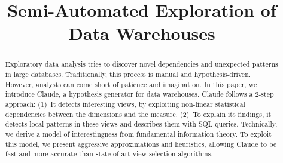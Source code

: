 \documentclass{sig-alternate}
\begin{document}
\title{Semi-Automated Exploration of Data Warehouses}



\maketitle

\begin{abstract}
Exploratory data analysis tries to discover novel dependencies and unexpected
patterns in large databases. Traditional\-ly, this process is manual and
hypothesis-driven. However, analysts can come short of patience and
imagination. In this paper, we introduce Claude, a hypothesis generator for
data warehouses. Claude follows a 2-step approach: (1)~It detects interesting
views, by exploiting non-linear statistical dependencies between the dimensions
and the measure. (2)~To explain its findings, it detects local patterns in
these views and describes them with SQL queries.  Technically, we derive a
model of interestingness from fundamental information theory. To exploit this
model, we present aggressive approximations and heuristics, allowing Claude to
be fast and more accurate than state-of-art view selection algorithms. 
\end{abstract}




\balancecolumns
\end{document}

